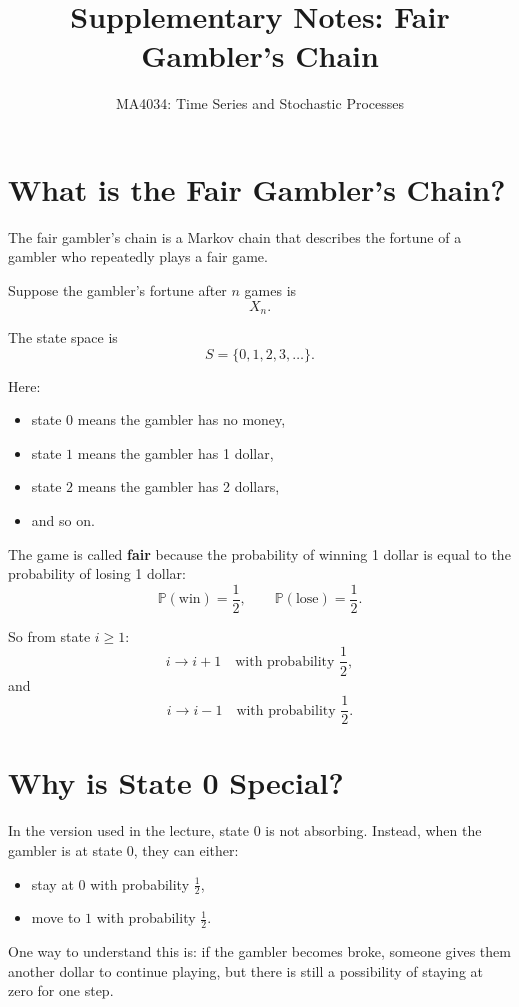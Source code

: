 \documentclass[12pt,a4paper]{article}
\title{\textbf{Supplementary Notes: Fair Gambler's Chain}}
\author{MA4034: Time Series and Stochastic Processes}
\date{}
\theoremstyle{notestyle}
\newcommand{\Prob}{\mathbb{P}}
\begin{document}
\maketitle

\section{What is the Fair Gambler's Chain?}

The fair gambler's chain is a Markov chain that describes the fortune of a gambler who repeatedly plays a fair game.

Suppose the gambler's fortune after $n$ games is
\[
X_n.
\]

The state space is
\[
S=\{0,1,2,3,\ldots\}.
\]

Here:
\begin{itemize}[leftmargin=1.2cm]
    \item state $0$ means the gambler has no money,
    \item state $1$ means the gambler has 1 dollar,
    \item state $2$ means the gambler has 2 dollars,
    \item and so on.
\end{itemize}

The game is called \textbf{fair} because the probability of winning 1 dollar is equal to the probability of losing 1 dollar:
\[
\Prob(\text{win})=\frac12,
\qquad
\Prob(\text{lose})=\frac12.
\]

So from state $i\geq 1$:
\[
i\to i+1
\quad\text{with probability }\frac12,
\]
and
\[
i\to i-1
\quad\text{with probability }\frac12.
\]

\section{Why is State 0 Special?}

In the version used in the lecture, state $0$ is not absorbing. Instead, when the gambler is at state $0$, they can either:
\begin{itemize}[leftmargin=1.2cm]
    \item stay at $0$ with probability $\frac12$,
    \item move to $1$ with probability $\frac12$.
\end{itemize}

One way to understand this is: if the gambler becomes broke, someone gives them another dollar to continue playing, but there is still a possibility of staying at zero for one step.
\end{document}
